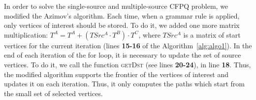 In order to solve the single-source and multiple-source CFPQ problem, we modified the Azimov's algorithm.
Each time, when a grammar rule is applied, only vertices of interest should be stored.
To do it, we added one more matrix multiplication: $T^A = T^A + (TSrc^A \cdot T^B) \cdot T^ C$, where $TSrc^A$ is a matrix of start vertices for the current iteration (lines \textbf{15-16} of the Algorithm~\ref{alg:algo1}).
In the end of each iteration of the for loop, it is necessary to update the set of source vertices.
To do it, we call the function \textsc{getDst} (see lines \textbf{20-24}), in line \textbf{18}.
Thus, the modified algorithm supports the frontier of the vertices of interest and updates it on each iteration.
Thus, it only computes the paths which start from the small set of selected vertices.